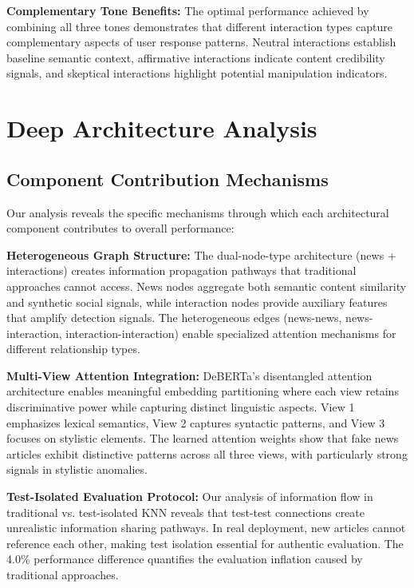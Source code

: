 \textbf{Complementary Tone Benefits:} The optimal performance achieved by combining all three tones demonstrates that different interaction types capture complementary aspects of user response patterns. Neutral interactions establish baseline semantic context, affirmative interactions indicate content credibility signals, and skeptical interactions highlight potential manipulation indicators.

\section{Deep Architecture Analysis}

\subsection{Component Contribution Mechanisms}

Our analysis reveals the specific mechanisms through which each architectural component contributes to overall performance:

\textbf{Heterogeneous Graph Structure:} The dual-node-type architecture (news + interactions) creates information propagation pathways that traditional approaches cannot access. News nodes aggregate both semantic content similarity and synthetic social signals, while interaction nodes provide auxiliary features that amplify detection signals. The heterogeneous edges (news-news, news-interaction, interaction-interaction) enable specialized attention mechanisms for different relationship types.

\textbf{Multi-View Attention Integration:} DeBERTa's disentangled attention architecture enables meaningful embedding partitioning where each view retains discriminative power while capturing distinct linguistic aspects. View 1 emphasizes lexical semantics, View 2 captures syntactic patterns, and View 3 focuses on stylistic elements. The learned attention weights show that fake news articles exhibit distinctive patterns across all three views, with particularly strong signals in stylistic anomalies.

\textbf{Test-Isolated Evaluation Protocol:} Our analysis of information flow in traditional vs. test-isolated KNN reveals that test-test connections create unrealistic information sharing pathways. In real deployment, new articles cannot reference each other, making test isolation essential for authentic evaluation. The 4.0\% performance difference quantifies the evaluation inflation caused by traditional approaches.

